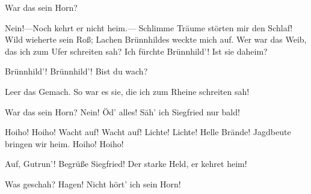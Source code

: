 \begin{drama}
\scene



\Gutrunespeaks

War das sein Horn?


Nein!---Noch kehrt er nicht heim.---
Schlimme Träume störten mir den Schlaf!
Wild wieherte sein Roß;
Lachen Brünnhildes weckte mich auf.
Wer war das Weib,
das ich zum Ufer schreiten sah?
Ich fürchte Brünnhild'!
Ist sie daheim?


Brünnhild'! Brünnhild'!
Bist du wach?


Leer das Gemach.
So war es sie,
die ich zum Rheine schreiten sah!


War das sein Horn?
Nein! Öd' alles!
Säh' ich Siegfried nur bald!
 






Hoiho! Hoiho!
Wacht auf! Wacht auf!
Lichte! Lichte! Helle Brände!
Jagdbeute bringen wir heim.
Hoiho! Hoiho!



\Hagenspeaks



Auf, Gutrun'! Begrüße Siegfried!
Der starke Held, er kehret heim!
 

\Gutrunespeaks



Was geschah? Hagen!
Nicht hört' ich sein Horn!
 




\Hagenspeaks


\end{drama}
